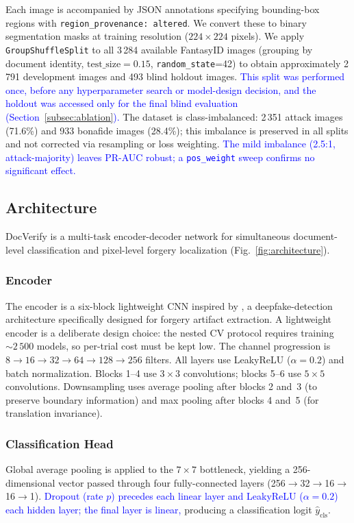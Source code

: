 \documentclass[final,5p,times,twocolumn,number]{elsarticle}
\newcommand{\rev}[1]{\textcolor{blue}{#1}}
\begin{document}
Each image is accompanied by JSON annotations specifying bounding-box regions
with \texttt{region\_provenance: altered}. We convert these to binary
segmentation masks at training resolution ($224 \times 224$ pixels). We
apply \texttt{GroupShuffleSplit} to all 3\,284 available FantasyID images
(grouping by document identity, $\text{test\_size}=0.15$,
\texttt{random\_state}=42) to obtain approximately 2\,791 development images
and 493 blind holdout images. \rev{This split was performed once,
before any hyperparameter search or model-design decision, and the holdout
was accessed only for the final blind evaluation
(Section~\ref{subsec:ablation}).} The dataset is class-imbalanced:
2\,351 attack images (71.6\%) and 933 bonafide images (28.4\%); this
imbalance is preserved in all splits and not corrected via resampling or
loss weighting. \rev{The mild imbalance (2.5:1, attack-majority)
leaves PR-AUC robust; a \texttt{pos\_weight} sweep confirms no significant
effect.}

\subsection{Architecture}
\label{subsec:arch}

DocVerify is a multi-task encoder-decoder network for simultaneous
document-level classification and pixel-level forgery localization
(Fig.~\ref{fig:architecture}).

\subsubsection{Encoder}
The encoder is a six-block lightweight CNN inspired by \citet{patel2023dcnn},
a deepfake-detection architecture specifically designed for forgery artifact
extraction. A lightweight encoder is a deliberate design choice: the nested
CV protocol requires training ${\sim}2\,500$ models, so per-trial cost must
be kept low. The channel progression is $8 \to 16 \to 32 \to 64 \to 128 \to
256$ filters. All layers use LeakyReLU ($\alpha=0.2$)
and batch normalization. Blocks 1--4 use $3 \times 3$
convolutions; blocks 5--6 use $5 \times 5$ convolutions. Downsampling uses
average pooling after blocks 2 and~3 (to preserve boundary information) and
max pooling after blocks 4 and~5 (for translation invariance).

\subsubsection{Classification Head}
Global average pooling is applied to the $7 \times 7$ bottleneck, yielding a
256-dimensional vector passed through four fully-connected layers
(256$\to$32$\to$16$\to$16$\to$1). \rev{Dropout (rate $p$) precedes each linear
layer and LeakyReLU ($\alpha=0.2$) each hidden layer; the final layer is linear,}
producing a classification logit $\hat{y}_{\text{cls}}$.
\end{document}
